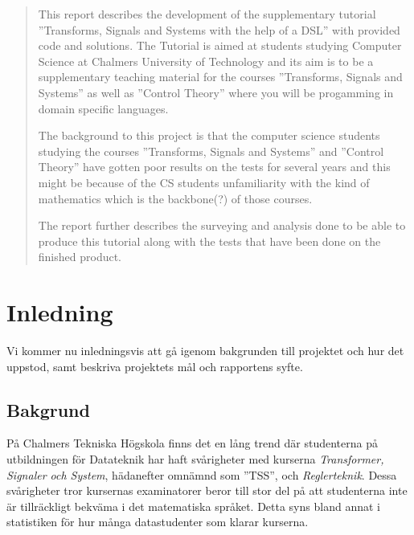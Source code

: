 \documentclass[]{article}
\begin{document}
\renewcommand*\abstractname{Abstract}
\begin{abstract}
  This report describes the development of the supplementary tutorial
  ''Transforms, Signals and Systems with the help of a DSL''
  with provided code and solutions.
  The Tutorial is aimed at students studying Computer Science at
  Chalmers University of Technology and its aim is to be a supplementary
  teaching material for the courses ''Transforms, Signals and Systems''
  as well as ''Control Theory'' where you will be progamming in
  domain specific languages.

  The background to this project is that the computer science students
  studying the courses ''Transforms, Signals and Systems'' and
  ''Control Theory'' have gotten poor results on the tests for several years
  and this might be because of the CS students unfamiliarity with the kind
  of mathematics which is the backbone(?) of those courses.

  The report further describes the surveying and analysis done to be able
  to produce this tutorial along with the tests that have been done on the
  finished product.
\end{abstract}
\newpage



\newpage
\tableofcontents

\newpage

\printglossary[title=Ordlista,nonumberlist]

\newpage

\setlength{\parskip}{2mm}
\setlength{\parindent}{0pt}


\section{Inledning}
Vi kommer nu inledningsvis att gå igenom bakgrunden till projektet och hur det
uppstod, samt beskriva projektets mål och rapportens syfte.

\subsection{Bakgrund}
%

På Chalmers Tekniska Högskola finns det en lång trend där
studenterna på utbildningen för Datateknik har haft svårigheter
med kurserna \textit{Transformer, Signaler och System}, hädanefter omnämnd
som ''\gls{TSS}'', och \textit{Reglerteknik}.
Dessa svårigheter tror kursernas examinatorer beror till stor del på att
studenterna inte är tillräckligt bekväma i det matematiska språket.
Detta syns bland annat i statistiken för hur många datastudenter som
klarar kurserna.
\end{document}
